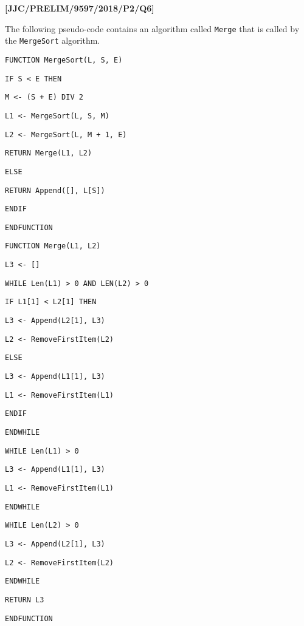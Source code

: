 \item \textbf{{[}JJC/PRELIM/9597/2018/P2/Q6{]} }

The following pseudo-code contains an algorithm called \texttt{Merge}
that is called by the \texttt{MergeSort} algorithm. 

\noindent %
\noindent\begin{minipage}[t]{1\columnwidth}%
\texttt{FUNCTION MergeSort(L, S, E)}

\texttt{\qquad{}IF S < E THEN }

\texttt{\qquad{}\qquad{}M <- (S + E) DIV 2 }

\texttt{\qquad{}\qquad{}L1 <- MergeSort(L, S, M) }

\texttt{\qquad{}\qquad{}L2 <- MergeSort(L, M + 1, E) }

\texttt{\qquad{}\qquad{}RETURN Merge(L1, L2)}

\texttt{\qquad{}ELSE }

\texttt{\qquad{}\qquad{}RETURN Append({[}{]}, L{[}S{]}) }

\texttt{\qquad{}ENDIF}

\texttt{ENDFUNCTION}

\bigskip{}

\texttt{FUNCTION Merge(L1, L2) }

\texttt{\qquad{}L3 <- {[}{]} }

\texttt{\qquad{}WHILE Len(L1) > 0 AND LEN(L2) > 0}

\texttt{\qquad{}\qquad{}IF L1{[}1{]} < L2{[}1{]} THEN }

\texttt{\qquad{}\qquad{}\qquad{}L3 <- Append(L2{[}1{]}, L3) }

\texttt{\qquad{}\qquad{}\qquad{}L2 <- RemoveFirstItem(L2) }

\texttt{\qquad{}\qquad{}ELSE }

\texttt{\qquad{}\qquad{}\qquad{}L3 <- Append(L1{[}1{]}, L3) }

\texttt{\qquad{}\qquad{}\qquad{}L1 <- RemoveFirstItem(L1) }

\texttt{\qquad{}\qquad{}ENDIF}

\texttt{\qquad{}ENDWHILE}

\texttt{\qquad{}WHILE Len(L1) > 0}

\texttt{\qquad{}\qquad{}L3 <- Append(L1{[}1{]}, L3) }

\texttt{\qquad{}\qquad{}L1 <- RemoveFirstItem(L1) }

\texttt{\qquad{}ENDWHILE }

\texttt{\qquad{}WHILE Len(L2) > 0 }

\texttt{\qquad{}\qquad{}L3 <- Append(L2{[}1{]}, L3)}

\texttt{\qquad{}\qquad{}L2 <- RemoveFirstItem(L2) }

\texttt{\qquad{}ENDWHILE }

\texttt{\qquad{}RETURN L3}

\texttt{ENDFUNCTION} %
\end{minipage}

